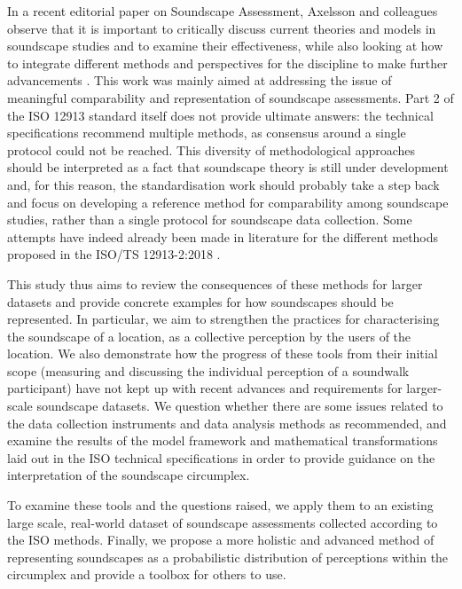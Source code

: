 In a recent editorial paper on Soundscape Assessment, Axelsson and colleagues observe that it is important to critically discuss current theories and models in soundscape studies and to examine their effectiveness, while also looking at how to integrate different methods and perspectives for the discipline to make further advancements \citep{Axelsson2019Editorial}. This work was mainly aimed at addressing the issue of meaningful comparability and representation of soundscape assessments. Part 2 of the ISO 12913 standard itself does not provide ultimate answers: the technical specifications recommend multiple methods, as consensus around a single protocol could not be reached. This diversity of methodological approaches should be interpreted as a fact that soundscape theory is still under development and, for this reason, the standardisation work should probably take a step back and focus on developing a reference method for comparability among soundscape studies, rather than a single protocol for soundscape data collection. Some attempts have indeed already been made in literature for the different methods proposed in the ISO/TS 12913-2:2018 \citep{Aletta2019Exploring, jo2020soundscape}.

This study thus aims to review the consequences of these methods for larger datasets and provide concrete examples for how soundscapes should be represented. In particular, we aim to strengthen the practices for characterising the soundscape of a location, as a collective perception by the users of the location. We also demonstrate how the progress of these tools from their initial scope (measuring and discussing the individual perception of a soundwalk participant) have not kept up with recent advances and requirements for larger-scale soundscape datasets. We question whether there are some issues related to the data collection instruments and data analysis methods as recommended, and examine the results of the model framework and mathematical transformations laid out in the ISO technical specifications in order to provide guidance on the interpretation of the soundscape circumplex.

To examine these tools and the questions raised, we apply them to an existing large scale, real-world dataset of soundscape assessments collected according to the ISO methods. Finally, we propose a more holistic and advanced method of representing soundscapes as a probabilistic distribution of perceptions within the circumplex and provide a toolbox for others to use.

